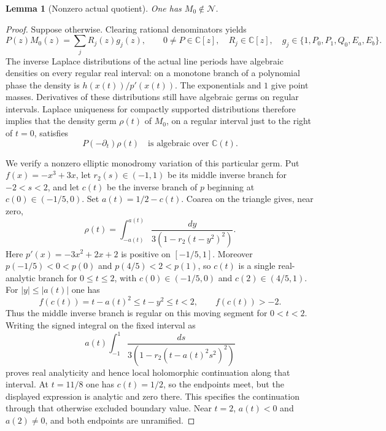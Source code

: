 \documentclass[11pt]{article}
\numberwithin{equation}{section}
\newtheorem{lemma}[lemma]{Lemma}
\theoremstyle{definition}
\theoremstyle{remark}
\newcommand{\C}{\mathbb C}
\newcommand{\Ncal}{\mathcal N}
\begin{document}
\begin{lemma}[Nonzero actual quotient]\label{lem:nonzero-quotient}
One has $M_0\notin\Ncal$.
\end{lemma}
\begin{proof}
Suppose otherwise. Clearing rational denominators yields
\[
 P(z)M_0(z)=\sum_jR_j(z)g_j(z),\qquad
 0\ne P\in\C[z],\quad R_j\in\C[z],\quad
 g_j\in\{1,P_0,P_1,Q_0,E_a,E_b\}.
\]
The inverse Laplace distributions of the actual line periods have
algebraic densities on every regular real interval: on a monotone branch
of a polynomial phase the density is $h(x(t))/p'(x(t))$.
The exponentials and $1$ give point masses. Derivatives of these
distributions still have algebraic germs on regular intervals.
Laplace uniqueness for compactly supported distributions therefore implies
that the density germ $\rho(t)$ of $M_0$, on a regular interval just to
the right of $t=0$, satisfies
\begin{equation}\label{eq:rho-algebraic}
 P(-\partial_t)\rho(t)\quad\text{is algebraic over }\C(t).
\end{equation}

We verify a nonzero elliptic monodromy variation of this particular germ.
Put $f(x)=-x^3+3x$, let $r_2(s)\in(-1,1)$ be its middle inverse branch
for $-2<s<2$, and let $c(t)$ be the inverse branch of $p$ beginning at
$c(0)\in(-1/5,0)$. Set $a(t)=1/2-c(t)$. Coarea on the triangle gives,
near zero,
\begin{equation}\label{eq:actual-density}
 \rho(t)=\int_{-a(t)}^{a(t)}
 \frac{dy}{3(1-r_2(t-y^2)^2)}.
\end{equation}
Here $p'(x)=-3x^2+2x+2$ is positive on $[-1/5,1]$.
Moreover $p(-1/5)<0<p(0)$ and $p(4/5)<2<p(1)$, so $c(t)$ is a
single real-analytic branch for $0\le t\le2$, with
$c(0)\in(-1/5,0)$ and $c(2)\in(4/5,1)$. For
$|y|\le|a(t)|$ one has
\[
 f(c(t))=t-a(t)^2\le t-y^2\le t<2,
 \qquad f(c(t))>-2.
\]
Thus the middle inverse branch is regular on this moving segment for
$0<t<2$. Writing the signed integral on the fixed interval as
\[
 a(t)\int_{-1}^1
 \frac{ds}{3(1-r_2(t-a(t)^2s^2)^2)}
\]
proves real analyticity and hence local holomorphic continuation along
that interval. At $t=11/8$ one has $c(t)=1/2$, so the endpoints meet,
but the displayed expression is analytic and zero there. This specifies
the continuation through that otherwise excluded boundary value. Near
$t=2$, $a(t)<0$ and $a(2)\ne0$, and both endpoints are unramified.


\end{proof}
\end{document}
